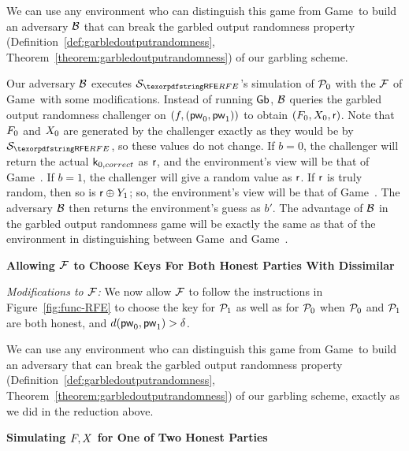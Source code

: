 \begin{games}
We can use any environment who can distinguish this game from Game~\previousgame to build an adversary $\mathcal{B}$ that can break the garbled output randomness property (Definition~\ref{def:garbledoutputrandomness}, Theorem~\ref{theorem:garbledoutputrandomness}) of our garbling scheme.

Our adversary $\mathcal{B}$ executes $\SimYGCRFE$'s simulation of $\mathcal{P}_{0}$ with the $\mathcal{F}$ of Game~\previousgame with some modifications.
Instead of running $\mathsf{Gb}$, $\mathcal{B}$ queries the garbled output randomness challenger on $(f, (\mathsf{pw}_{0}, \mathsf{pw}_{1}))$ to obtain $(F_{0}, X_{0}, \mathsf{r})$.
Note that $F_{0}$ and $X_{0}$ are generated by the challenger exactly as they would be by $\SimYGCRFE$, so these values do not change. 
If $b = 0$, the challenger will return the actual $\mathsf{k}_{0, correct}$ as $\mathsf{r}$, and the environment's view will be that of Game~\previousgame.
If $b = 1$, the challenger will give a random value as $\mathsf{r}$.
If $\mathsf{r}$ is truly random, then so is $\mathsf{r} \oplus Y_{1}$; so, the environment's view will be that of Game~\thisgame.
The adversary $\mathcal{B}$ then returns the environment's guess as $b'$.
The advantage of $\mathcal{B}$ in the garbled output randomness game will be exactly the same as that of the environment in distinguishing between Game~\previousgame and Game~\thisgame.

\textbf{Allowing $\mathcal{F}$ to Choose Keys For Both Honest Parties With Dissimilar \Passwords}

\textit{Modifications to $\mathcal{F}$:}
We now allow $\mathcal{F}$ to follow the instructions in Figure~\ref{fig:func-RFE} to choose the key for $\mathcal{P}_{1}$ as well as for $\mathcal{P}_{0}$ when $\mathcal{P}_{0}$ and $\mathcal{P}_{1}$ are both honest, and $d(\mathsf{pw}_{0}, \mathsf{pw}_{1}) > \delta$.

We can use any environment who can distinguish this game from Game~\previousgame to build an adversary that can break the garbled output randomness property (Definition~\ref{def:garbledoutputrandomness}, Theorem~\ref{theorem:garbledoutputrandomness}) of our garbling scheme, exactly as we did in the reduction above.

\textbf{Simulating $F, X$ for One of Two Honest Parties}


\end{games}
